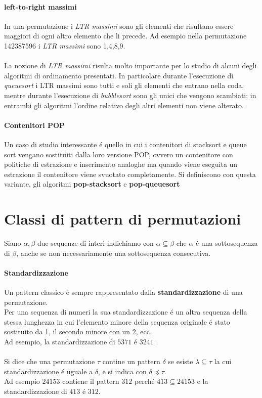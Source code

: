 \paragraph*{left-to-right massimi} In una permutazione i \textit{LTR massimi} sono gli elementi che risultano essere maggiori di ogni altro elemento che li precede. Ad esempio nella permutazione 142387596 i \textit{LTR massimi} sono 1,4,8,9.\\\\
La nozione di \textit{LTR massimi} risulta molto importante per lo studio di alcuni degli algoritmi di ordinamento presentati. In particolare durante l'esecuzione di \textit{queuesort} i LTR massimi sono tutti e soli gli elementi che entrano nella coda, mentre durante l'esecuzione di \textit{bubblesort} sono gli unici che vengono scambiati; in entrambi gli algoritmi l'ordine relativo degli altri elementi non viene alterato.
\paragraph*{Contenitori POP}Un caso di studio interessante \'e quello in cui i contenitori di stacksort e queue sort vengano sostituiti dalla loro versione POP, ovvero un contenitore con politiche di estrazione e inserimento analoghe ma quando viene eseguita un estrazione il contenitore viene svuotato completamente. Si definiscono con questa variante, gli algoritmi \textbf{pop-stacksort} e \textbf{pop-queuesort} 
\section*{Classi di pattern di permutazioni}
Siano $\alpha,\beta$ due sequenze di interi indichiamo con $\alpha \subseteq \beta$ che $\alpha$ \'e una sottosequenza di $\beta$, anche se non necessariamente una sottosequenza consecutiva\cite{bouvel2022preimages}.
\paragraph*{Standardizzazione}
Un pattern classico \'e sempre rappresentato dalla \textbf{standardizzazione} di una permutazione.\\Per una sequenza di numeri la sua standardizzazione\cite{claesson2012sorting} \'e un altra sequenza della stessa lunghezza in cui l'elemento minore della sequenza originale \'e stato sostituito da 1, il secondo minore con un 2, ecc.\\
Ad esempio, la standardizzazione di $5371$ \'e $3241$ .\\\\
Si dice che una permutazione $\tau$ contine un pattern $\delta$ se esiste $\lambda\subseteq\tau$ la cui standardizzazione \'e uguale a $\delta$, e si indica con $\delta\preceq\tau$. \\Ad esempio $24153$ contiene il pattern $312$ perch\'e $413\subseteq{24153}$ e la standardizzazione di $413$ \'e $312$.
